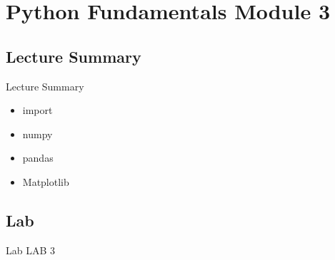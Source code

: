 \section{Python Fundamentals Module 3}

\subsection{Lecture Summary}
\begin{Slide}{Lecture Summary}
  \begin{itemize}
  \item import
  \item numpy
  \item pandas
  \item Matplotlib
  \end{itemize}
\end{Slide}


\subsection{Lab}
\begin{Slide}{Lab}
  LAB 3
\end{Slide}
